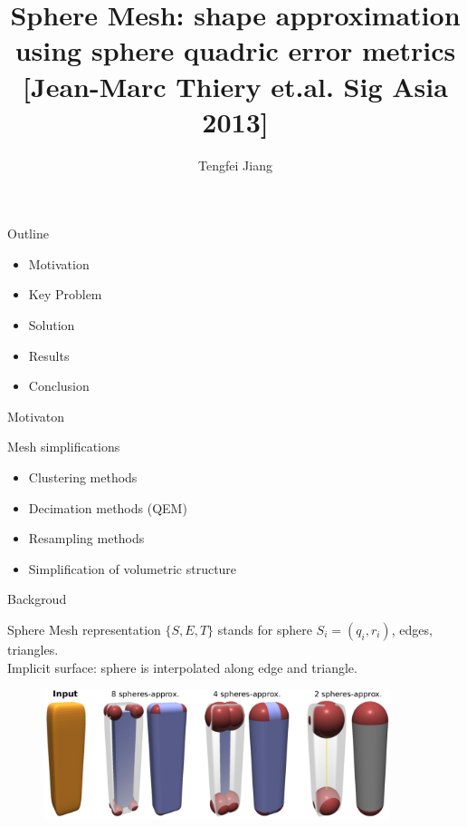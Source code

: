 \documentclass{beamer}
\begin{document}
\title{Sphere Mesh: shape approximation using sphere quadric error metrics\\
\small{[Jean-Marc Thiery et.al. Sig Asia 2013]}}
\author{Tengfei Jiang}

\newcommand{\FPP}[2]{\frac{\partial #1}{\partial #2}}
\begin{frame}
  \titlepage
\end{frame}

\begin{frame}{Outline}
\begin{itemize}
\item Motivation
\item Key Problem
\item Solution
\item Results
\item Conclusion
\end{itemize}
\end{frame}

\begin{frame}{Motivaton}
\begin{block}{Mesh simplifications}
\begin{itemize}
\item Clustering methods
\item Decimation methods (QEM)
\item Resampling methods
\item Simplification of volumetric structure
\end{itemize}
\end{block}
\end{frame}

\begin{frame}{Backgroud}
\begin{block}{Sphere Mesh representation}
$\{S,E,T\}$ stands for sphere $S_i=(q_i,r_i)$, edges, triangles.\\
Implicit surface: sphere is interpolated along edge and triangle.
\end{block}
\begin{figure}
\includegraphics[height=1.5in]{./img/representation.png}
\end{figure}
\end{frame}
\end{document}
